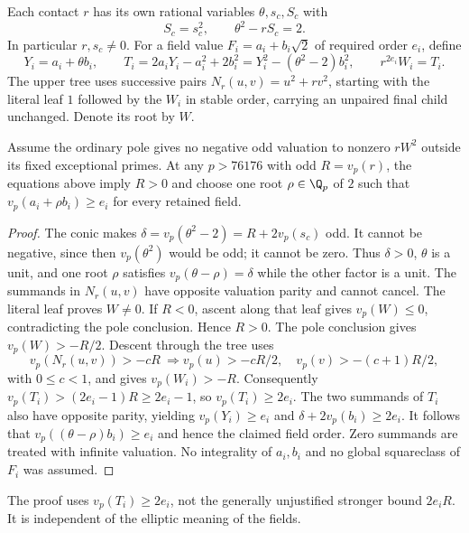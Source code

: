 Each contact $r$ has its own rational variables $\theta,s_c,S_c$ with
\[
 S_c=s_c^2,\qquad \theta^2-rS_c=2.
\]
In particular $r,s_c\ne0$. For a field value $F_i=a_i+b_i\sqrt2$ of
required order $e_i$, define
\[
 Y_i=a_i+\theta b_i,\qquad
 T_i=2a_iY_i-a_i^2+2b_i^2
     =Y_i^2-(\theta^2-2)b_i^2,\qquad
 r^{2e_i}W_i=T_i.
\]
The upper tree uses successive pairs $N_r(u,v)=u^2+rv^2$, starting with
the literal leaf $1$ followed by the $W_i$ in stable order, carrying an
unpaired final child unchanged. Denote its root by $W$.

\begin{lemma}
\label{lem:quartic-private-conic-packing}
Assume the ordinary pole gives no negative odd valuation to nonzero
$rW^2$ outside its fixed exceptional primes. At any $p>76176$ with odd
$R=v_p(r)$, the equations above imply $R>0$ and choose one root
$\rho\in\Q_p$ of $2$ such that
$v_p(a_i+\rho b_i)\ge e_i$ for every retained field.
\end{lemma}
\begin{proof}
The conic makes $\delta=v_p(\theta^2-2)=R+2v_p(s_c)$ odd.
It cannot be negative, since then $v_p(\theta^2)$ would be odd; it cannot
be zero. Thus $\delta>0$, $\theta$ is a unit, and one root $\rho$ satisfies
$v_p(\theta-\rho)=\delta$ while the other factor is a unit.
The summands in $N_r(u,v)$ have opposite valuation parity and cannot
cancel. The literal leaf proves $W\ne0$. If $R<0$, ascent along that
leaf gives $v_p(W)\le0$, contradicting the pole conclusion. Hence $R>0$.
The pole conclusion gives $v_p(W)>-R/2$. Descent through the tree uses
\[
 v_p(N_r(u,v))>-cR\ \Longrightarrow
 v_p(u)>-cR/2,\quad v_p(v)>-(c+1)R/2,
\]
with $0\le c<1$, and gives $v_p(W_i)>-R$. Consequently
$v_p(T_i)>(2e_i-1)R\ge2e_i-1$, so $v_p(T_i)\ge2e_i$.
The two summands of $T_i$ also have opposite parity, yielding
$v_p(Y_i)\ge e_i$ and $\delta+2v_p(b_i)\ge2e_i$.
It follows that $v_p((\theta-\rho)b_i)\ge e_i$ and hence the claimed
field order. Zero summands are treated with infinite valuation. No
integrality of $a_i,b_i$ and no global squareclass of $F_i$ was assumed.
\end{proof}

The proof uses $v_p(T_i)\ge2e_i$, not the generally unjustified stronger
bound $2e_iR$. It is independent of the elliptic meaning of the fields.

